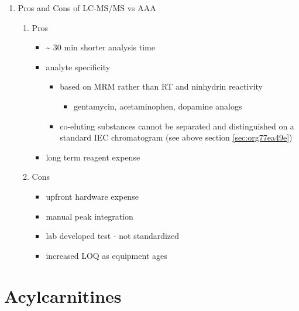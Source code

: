 \documentclass{scrartcl}
\begin{document}
\begin{enumerate}
\item Pros and Cons of LC-MS/MS vs AAA
\label{sec:org054bb66}
\begin{enumerate}
\item Pros
\label{sec:orgac954c9}
\begin{itemize}
\item \textasciitilde{} 30 min shorter analysis time
\item analyte specificity
\begin{itemize}
\item based on MRM rather than RT and ninhydrin reactivity
\begin{itemize}
\item gentamycin, acetaminophen, dopamine analogs
\end{itemize}
\item co-eluting substances cannot be separated and distinguished on a
standard IEC chromatogram (see above section \ref{sec:org77ea49e})
\end{itemize}
\item long term reagent expense
\end{itemize}

\item Cons
\label{sec:org7a03d64}
\begin{itemize}
\item upfront hardware expense
\item manual peak integration
\item lab developed test - not standardized
\item increased LOQ as equipment ages
\end{itemize}
\end{enumerate}
\end{enumerate}
\section{Acylcarnitines}
\label{sec:org4a28068}
\end{document}
